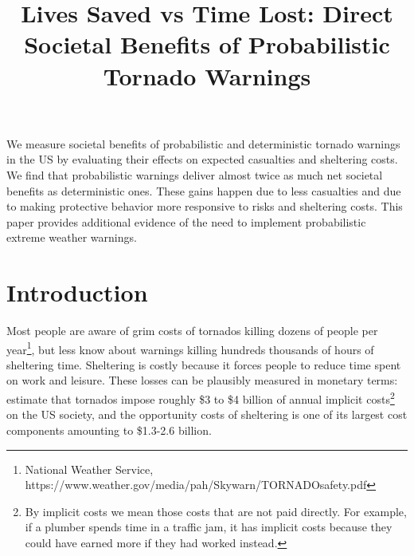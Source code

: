 \documentclass{ametsocV6.1}
\title{Lives Saved vs Time Lost: Direct Societal Benefits of Probabilistic Tornado Warnings}
\affiliation{\aff{a}{University of Oklahoma, CIMMS}}
\begin{document}
\maketitle

%
%
%
\statement
	We measure societal benefits of probabilistic and deterministic tornado warnings in the US by evaluating their effects on expected casualties and sheltering costs. We find that probabilistic warnings deliver almost twice as much net societal benefits as deterministic ones. These gains happen due to less casualties and due to making protective behavior more responsive to risks and sheltering costs.  This paper provides additional evidence of the need to implement probabilistic extreme weather warnings.
%
% 


%
\section{Introduction}

Most people are aware of grim costs of tornados killing dozens of people per year\footnote{National Weather Service, https://www.weather.gov/media/pah/Skywarn/TORNADOsafety.pdf}, but less know about warnings killing hundreds thousands of hours of sheltering time.  Sheltering is costly because it forces people to reduce time spent on work and leisure. These losses can be plausibly measured in monetary terms: \citet{simmons_economic_2013} estimate that tornados impose roughly \$3 to \$4 billion of annual implicit costs\footnote{By implicit costs we mean those costs that are not paid directly. For example, if a plumber spends time in a traffic jam, it has implicit costs because they could have earned more if they had worked instead.} on the US society, and the opportunity costs of sheltering is one of its largest cost components amounting to \$1.3-2.6 billion.
\end{document}
